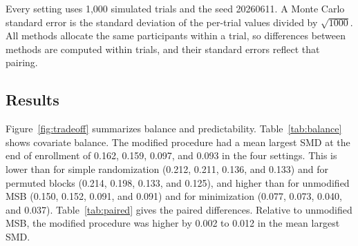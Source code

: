 \documentclass[bib]{statapress}
\begin{document}
Every setting uses 1,000 simulated trials and the seed 20260611. A Monte Carlo
standard error is the standard deviation of the per-trial values divided by
$\sqrt{1000}$. All methods allocate the same participants within a trial, so
differences between methods are computed within trials, and their standard
errors reflect that pairing.

\subsection{Results}

Figure~\ref{fig:tradeoff} summarizes balance and predictability.
Table~\ref{tab:balance} shows covariate balance. The modified procedure had a
mean largest SMD at the end of enrollment of 0.162, 0.159, 0.097, and 0.093 in
the four settings. This is lower than for simple randomization (0.212, 0.211,
0.136, and 0.133) and for permuted blocks (0.214, 0.198, 0.133, and 0.125), and
higher than for unmodified MSB (0.150, 0.152, 0.091, and 0.091) and for
minimization (0.077, 0.073, 0.040, and 0.037). Table~\ref{tab:paired} gives the
paired differences. Relative to unmodified MSB, the modified procedure was higher
by 0.002 to 0.012 in the mean largest SMD.
\end{document}
